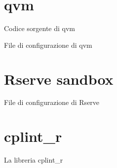 \documentclass[10pt,titlepage,twoside,a4paper]{report}
\newenvironment{code}{\singlespacing\captionsetup{type=listing}}{}
\begin{document}


\appendix
\chapter{qvm} \label{app:qvm}

    \begin{code}
        \caption{Codice sorgente di qvm}
    \end{code}

    \newpage

    \begin{code}
        \caption{File di configurazione di qvm}
    \end{code}




\chapter{Rserve sandbox} \label{app:rserve-sandbox}
    \begin{code}
        \caption{File di configurazione di Rserve}
    \end{code}

\chapter{cplint\_r} \label{app:cplint-r}
    \begin{code}
        \caption{La libreria cplint\_r}
    \end{code}






\end{document}
